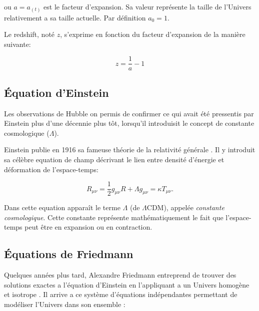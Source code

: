 ou $a = a_{(t)}$ est le facteur d'expansion.
Sa valeur représente la taille de l'Univers relativement a sa taille actuelle.
Par définition $a_0 = 1$.

Le redshift, noté $z$, s'exprime en fonction du facteur d'expansion de la manière suivante:

\begin{equation}
z= \frac{1}{a}-1
\end{equation}

\subsection{Équation d'Einstein}

Les observations de Hubble on permis de confirmer ce qui avait été pressentis par Einstein plus d'une décennie plus tôt, lorsqu'il introduisit le concept de constante cosmologique ($\Lambda$). 

Einstein publie en 1916 sa fameuse théorie de la relativité générale \citep{1916AnP...354..769E}.
Il y introduit sa célèbre equation de champ décrivant le lien entre densité d'énergie et déformation de l'espace-temps:

\begin{equation}
R_{\mu\nu} = \frac{1}{2} g_{\mu\nu}R + \Lambda g_{\mu\nu}  = \kappa T_{\mu\nu}.
\label{eq:einstein}
\end{equation} 

Dans cette equation apparaît le terme $\Lambda$ (de $\Lambda$CDM), appelée \textit{constante cosmologique}.
Cette constante représente mathématiquement le fait que l'espace-temps peut être en expansion ou en contraction.


\subsection{Équations de Friedmann}
\label{sec:friedman}


Quelques années plus tard, Alexandre Friedmann entreprend de trouver des solutions exactes a l'équation d'Einstein en l'appliquant a un Univers homogène et isotrope \citep{1922ZPhy...10..377F}.
Il arrive a ce système d'équations indépendantes permettant de modéliser l'Univers dans son ensemble :

% 
%
% 
 
